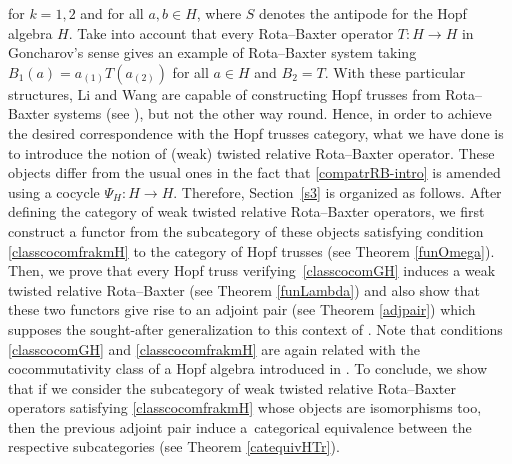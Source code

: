 \documentclass[10pt,a4paper]{amsart}
\numberwithin{equation}{section}
\begin{document}
for $k=1,2$ and for all $a,b\in H$, where $S$ denotes the antipode for the Hopf algebra $H$. Take into account that every Rota--Baxter operator $T\colon H\rightarrow H$ in Goncharov's sense gives an example of Rota--Baxter system taking $B_{1}(a)=a_{(1)}T(a_{(2)})$ for all $a\in H$ and $B_{2}=T$. With these particular structures, Li and Wang are capable of constructing Hopf trusses from Rota--Baxter systems (see \cite[Proposition 3.8]{LW2}), but not the other way round. Hence, in order to achieve the desired correspondence with the Hopf trusses category, what we have done is to introduce the notion of (weak) twisted relative Rota--Baxter operator. These objects differ from the usual ones in the fact that \eqref{compatrRB-intro} is amended using a cocycle $\Psi_{H}\colon H\rightarrow H$. Therefore, Section~\ref{s3} is organized as follows. After defining the category of weak twisted relative Rota--Baxter operators, we first construct a functor from the subcategory of these objects satisfying condition \eqref{classcocomfrakmH} to the category of Hopf trusses (see Theorem \ref{funOmega}). Then, we prove that every Hopf truss verifying~\eqref{classcocomGH} induces a weak twisted relative Rota--Baxter (see Theorem \ref{funLambda}) and also show that these two functors give rise to an adjoint pair (see Theorem \ref{adjpair}) which supposes the sought-after generalization to this context of \cite[Theorem 3.3]{LST}. Note that conditions \eqref{classcocomGH} and \eqref{classcocomfrakmH} are again related with the cocommutativity class of a Hopf algebra introduced in \cite{CCH}. To conclude, we show that if we consider the subcategory of weak twisted relative Rota--Baxter operators satisfying \eqref{classcocomfrakmH} whose objects are isomorphisms too, then the previous adjoint pair induce a~categorical equivalence between the respective subcategories (see Theorem \ref{catequivHTr}).
\end{document}
